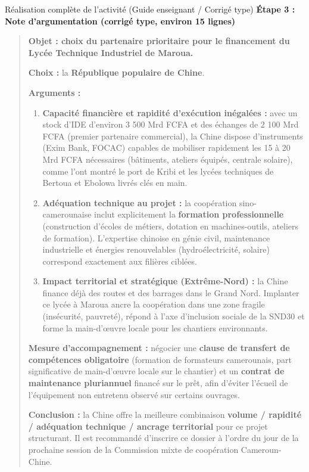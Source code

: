 \documentclass[11pt]{article}
\begin{document}
\begin{exoresolu}{Réalisation complète de l'activité (Guide enseignant / Corrigé type)}
\medskip
\noindent \textbf{Étape 3 : Note d'argumentation (corrigé type, environ 15 lignes)}
\begin{quote}
\textbf{Objet : choix du partenaire prioritaire pour le financement du Lycée Technique Industriel de Maroua.}

\noindent \textbf{Choix :} la \textbf{République populaire de Chine}.

\noindent \textbf{Arguments :}
\begin{enumerate}
    \item \textbf{Capacité financière et rapidité d'exécution inégalées :} avec un stock d'IDE d'environ 3 500 Mrd FCFA et des échanges de 2 100 Mrd FCFA (premier partenaire commercial), la Chine dispose d'instruments (Exim Bank, FOCAC) capables de mobiliser rapidement les 15 à 20 Mrd FCFA nécessaires (bâtiments, ateliers équipés, centrale solaire), comme l'ont montré le port de Kribi et les lycées techniques de Bertoua et Ebolowa livrés clés en main.
    \item \textbf{Adéquation technique au projet :} la coopération sino-camerounaise inclut explicitement la \textbf{formation professionnelle} (construction d'écoles de métiers, dotation en machines-outils, ateliers de formation). L'expertise chinoise en génie civil, maintenance industrielle et énergies renouvelables (hydroélectricité, solaire) correspond exactement aux filières ciblées.
    \item \textbf{Impact territorial et stratégique (Extrême-Nord) :} la Chine finance déjà des routes et des barrages dans le Grand Nord. Implanter ce lycée à Maroua ancre la coopération dans une zone fragile (insécurité, pauvreté), répond à l'axe d'inclusion sociale de la SND30 et forme la main-d'œuvre locale pour les chantiers environnants.
\end{enumerate}
\noindent \textbf{Mesure d'accompagnement :} négocier une \textbf{clause de transfert de compétences obligatoire} (formation de formateurs camerounais, part significative de main-d'œuvre locale sur le chantier) et un \textbf{contrat de maintenance pluriannuel} financé sur le prêt, afin d'éviter l'écueil de l'équipement non entretenu observé sur certains ouvrages.

\noindent \textbf{Conclusion :} la Chine offre la meilleure combinaison \textbf{volume / rapidité / adéquation technique / ancrage territorial} pour ce projet structurant. Il est recommandé d'inscrire ce dossier à l'ordre du jour de la prochaine session de la Commission mixte de coopération Cameroun-Chine.
\end{quote}


\end{exoresolu}
\end{document}
